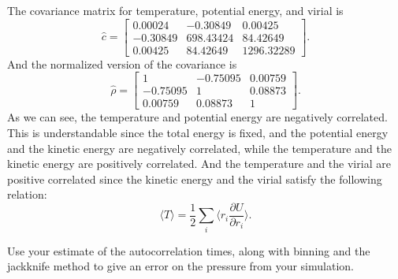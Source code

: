\Answer{}
The covariance matrix for temperature, potential energy, and virial is
%
\begin{equation}
    \hat{c} =
    \begin{bmatrix}
        0.00024  & -0.30849  & 0.00425    \\
        -0.30849 & 698.43424 & 84.42649   \\
        0.00425  & 84.42649  & 1296.32289
    \end{bmatrix}.
\end{equation}
%
And the normalized version of the covariance is
%
\begin{equation}
    \hat{\rho} =
    \begin{bmatrix}
        1        & -0.75095 & 0.00759 \\
        -0.75095 & 1        & 0.08873 \\
        0.00759  & 0.08873  & 1
    \end{bmatrix}.
\end{equation}
%
As we can see, the temperature and potential energy are negatively correlated.
This is understandable since the total energy is fixed, and the potential energy and
the kinetic energy are negatively correlated, while the temperature and the kinetic
energy are positively correlated.
And the temperature and the virial are positive correlated since the kinetic energy
and the virial satisfy the following relation:
%
\begin{equation}
    \langle T \rangle = \frac{ 1 }{ 2 }
    \sum_i
    \biggl\langle r_i \frac{ \partial U }{ \partial r_i } \biggr\rangle.
\end{equation}


\Question{} Use your estimate of the autocorrelation times, along with binning and the
jackknife method to give an error on the pressure from your simulation.

\Answer{}

